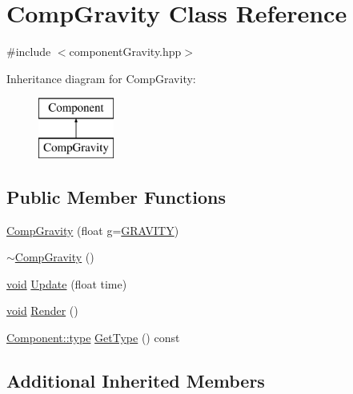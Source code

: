\hypertarget{class_comp_gravity}{\section{Comp\-Gravity Class Reference}
\label{class_comp_gravity}
}


{\ttfamily \#include $<$component\-Gravity.\-hpp$>$}

Inheritance diagram for Comp\-Gravity\-:\begin{figure}[H]
\begin{center}
\leavevmode
\includegraphics[height=2.000000cm]{class_comp_gravity}
\end{center}
\end{figure}
\subsection*{Public Member Functions}
\begin{DoxyCompactItemize}
\item 
\hyperlink{class_comp_gravity_a694aed4a38d7c2cb904b6981a9c3757d}{Comp\-Gravity} (float \hyperlink{_s_d_l__opengl__glext_8h_acaceb3a655ff28b75259860bcb868f9f}{g}=\hyperlink{common_8hpp_a6801baa546c6112d19eb095111d24720}{G\-R\-A\-V\-I\-T\-Y})
\item 
\hyperlink{class_comp_gravity_a18128ddffcff301382dc4f84567ba582}{$\sim$\-Comp\-Gravity} ()
\item 
\hyperlink{_s_d_l__opengles2__gl2ext_8h_ae5d8fa23ad07c48bb609509eae494c95}{void} \hyperlink{class_comp_gravity_a8d229e6d5f10dd78f343e6cfb35feb42}{Update} (float time)
\item 
\hyperlink{_s_d_l__opengles2__gl2ext_8h_ae5d8fa23ad07c48bb609509eae494c95}{void} \hyperlink{class_comp_gravity_a87d2f55051fe45905a21e7a98639dca0}{Render} ()
\item 
\hyperlink{class_component_ad6d161b6acf7b843b55bb9feac7af71a}{Component\-::type} \hyperlink{class_comp_gravity_aa480e4c57226eb0363478f1543fc411a}{Get\-Type} () const 
\end{DoxyCompactItemize}
\subsection*{Additional Inherited Members}


